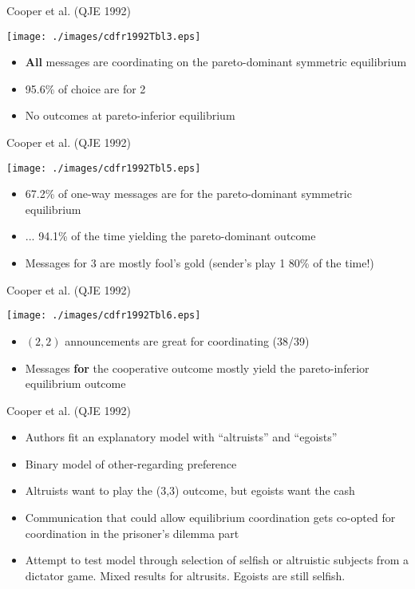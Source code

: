 \documentclass{beamer}
\begin{document}
\begin{frame}{Cooper et al. (QJE 1992)}
\begin{center}\texttt{[image: ./images/cdfr1992Tbl3.eps]}\end{center}
	\begin{itemize}
		\item \textbf{All} messages are coordinating on the pareto-dominant symmetric equilibrium
		\item 95.6\% of choice are for 2
		\item No outcomes at pareto-inferior equilibrium
	\end{itemize}
\end{frame}
\begin{frame}{Cooper et al. (QJE 1992)}
\begin{center}\texttt{[image: ./images/cdfr1992Tbl5.eps]}\end{center}
	\begin{itemize}
		\item 67.2\% of one-way messages are for the pareto-dominant symmetric equilibrium
		\item ... 94.1\% of the time yielding the pareto-dominant outcome
		\item Messages for 3 are mostly fool's gold (sender's play 1 80\% of the time!)
	\end{itemize}
\end{frame}
\begin{frame}{Cooper et al. (QJE 1992)}
\begin{center}\texttt{[image: ./images/cdfr1992Tbl6.eps]}\end{center}
	\begin{itemize}
		\item $(2,2)$ announcements are great for coordinating (38/39)
		\item Messages \textbf{for} the cooperative outcome mostly yield the pareto-inferior equilibrium outcome
	\end{itemize}
\end{frame}
\begin{frame}{Cooper et al. (QJE 1992)}
	\begin{itemize}
		\item Authors fit an explanatory model with ``altruists'' and ``egoists''
		\item Binary model of other-regarding preference
		\item Altruists want to play the (3,3) outcome, but egoists want the cash
		\item Communication that could allow equilibrium coordination gets co-opted for coordination in the prisoner's dilemma part
		\item Attempt to test model through selection of selfish or altruistic subjects from a dictator game. Mixed results for altrusits. Egoists are still selfish.
	\end{itemize}
\end{frame}
\end{document}
